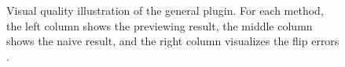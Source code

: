 \documentclass[letterpaper]{article} %
\begin{document}
\begin{figure}[htbp]
  \centering
  \caption{Visual quality illustration of the general plugin. For each method, the left column shows the previewing result, the middle column shows the naive result, and the right column visualizes the flip errors \cite{Andersson2020}.}
  \label{fig:3based}
\end{figure}
\end{document}
